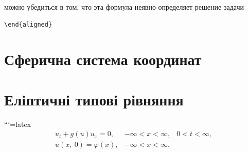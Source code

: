 \documentclass[
  ukrainian,
]{article}
\begin{document}
можно убедиться в том, что эта формула неявно определяет решение задачи

\begin{verbatim}
\end{aligned}
\end{verbatim}

\section{Сферична система
координат}\label{ux441ux444ux435ux440ux438ux447ux43dux430-ux441ux438ux441ux442ux435ux43cux430-ux43aux43eux43eux440ux434ux438ux43dux430ux442}

\section{Еліптичні типові
рівняння}\label{ux435ux43bux456ux43fux442ux438ux447ux43dux456-ux442ux438ux43fux43eux432ux456-ux440ux456ux432ux43dux44fux43dux43dux44f}

```{=latex}
\[
\begin{aligned} u_t + g\left(u\right) u_x = 0, & -\infty < x < \infty, & 0 < t < \infty, \\ u\left(x, \ 0\right) = \varphi\left(x\right), & -\infty < x < \infty. \end{aligned}
\]
\end{document}
